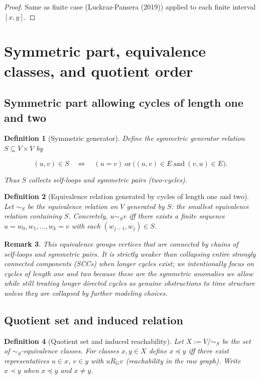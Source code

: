 \documentclass[11pt]{article}
\newtheorem{definition}{Definition}[section]
\newtheorem{remark}[definition]{Remark}
\begin{document}
\begin{proof}
Same as finite case (Luckraz-Pansera (2019)) applied to each finite interval \([x,y]\).
\end{proof}






\section{Symmetric part, equivalence classes, and quotient order}\label{sec:quotient}
\subsection{Symmetric part allowing cycles of length one and two}
\begin{definition}[Symmetric generator]
Define the \emph{symmetric generator} relation \(S\subseteq V\times V\) by


\[
(u,v)\in S \quad\Longleftrightarrow\quad (u=v)\ \text{or}\ \big((u,v)\in E\ \text{and}\ (v,u)\in E\big).
\]


Thus \(S\) collects self‑loops and symmetric pairs (two‑cycles).
\end{definition}

\begin{definition}[Equivalence relation generated by cycles of length one and two]
Let \(\sim_S\) be the equivalence relation on \(V\) generated by \(S\):
the smallest equivalence relation containing \(S\). Concretely, \(u\sim_S v\)
iff there exists a finite sequence \(u=w_0,w_1,\dots,w_k=v\) with each
\((w_{j-1},w_j)\in S\).
\end{definition}

\begin{remark}
This equivalence groups vertices that are connected by chains of
self‑loops and symmetric pairs. It is strictly weaker than collapsing
entire strongly connected components (SCCs) when longer cycles exist;
we intentionally focus on cycles of length one and two because these are
the symmetric anomalies we allow while still treating longer directed
cycles as genuine obstructions to time structure unless they are
collapsed by further modeling choices.
\end{remark}

\subsection{Quotient set and induced relation}
\begin{definition}[Quotient set and induced reachability]
Let \(X:=V/\!\sim_S\) be the set of \(\sim_S\)-equivalence classes. For
classes \(x,y\in X\) define \(x\preceq y\) iff there exist representatives
\(u\in x\), \(v\in y\) with \(uR_G v\) (reachability in the raw graph).
Write \(x\prec y\) when \(x\preceq y\) and \(x\neq y\).
\end{definition}
\end{document}

